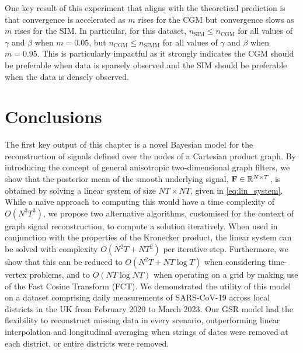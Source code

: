 One key result of this experiment that aligns with the theoretical prediction is that convergence is accelerated as $m$ rises for the CGM but convergence slows as $m$ rises for the SIM. In particular, for this dataset, $n_\text{SIM} \leq n_\text{CGM}$ for all values of $\gamma$ and $\beta$ when $m=0.05$, but $n_\text{CGM} \leq n_\text{SIMM}$ for all values of $\gamma$ and $\beta$ when $m=0.95$. This is particularly impactful as it strongly indicates the CGM should be preferable when data is sparsely observed and the SIM should be preferable when the data is densely observed. 


\section{Conclusions}

The first key output of this chapter is a novel Bayesian model for the reconstruction of signals defined over the nodes of a Cartesian product graph. By introducing the concept of general anisotropic two-dimensional graph filters, we show that the posterior mean of the smooth underlying signal, $\mathbf{F} \in \mathbb{R}^{N \times T}$, is obtained by solving a linear system of size $NT \times NT$, given in \cref{eq:lin_system}. While a naive approach to computing this would have a time complexity of $O(N^3T^3)$, we propose two alternative algorithms, customised for the context of graph signal reconstruction, to compute a solution iteratively. When used in conjunction with the properties of the Kronecker product, the linear system can be solved with complexity $O(N^2T + NT^2)$ per iterative step. Furthermore, we show that this can be reduced to $O(N^2T + NT \log T)$ when considering time-vertex problems, and to $O(NT \log NT)$ when operating on a grid by making use of the Fast Cosine Transform (FCT). We demonstrated the utility of this model on a dataset comprising daily measurements of SARS-CoV-19 across local districts in the UK from February 2020 to March 2023. Our GSR model had the flexibility to reconstruct missing data in every scenario, outperforming linear interpolation and longitudinal averaging when strings of dates were removed at each district, or entire districts were removed. 

